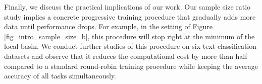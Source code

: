 



Finally, we discuss the practical implications of our work.
Our sample size ratio study implies a concrete progressive training procedure that gradually adds more data until performance drops.
For example, in the setting of Figure \ref{fig_intro_sample_size_b}, this procedure will stop right at the minimum of the local basin.
We conduct further studies of this procedure on six text classification datasets and observe that it reduces the computational cost by more than half compared to a standard round-robin training procedure while keeping the average accuracy of all tasks simultaneously.

